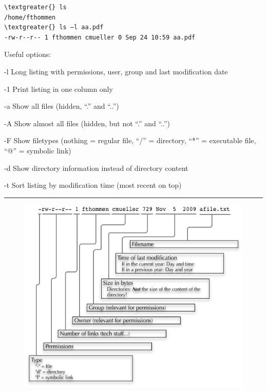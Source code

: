 \documentclass[letterpaper,10pt,english]{sphinxmanual}
\begin{document}
\begin{Verbatim}[commandchars=\\\{\}]
\textgreater{} ls
/home/fthommen
\textgreater{} ls –l aa.pdf
-rw-r--r-- 1 fthommen cmueller 0 Sep 24 10:59 aa.pdf
\end{Verbatim}

Useful options:
\begin{optionlist}{3cm}
\item [-l]  
Long listing with permissions, user, group and last modification date
\item [-1]  
Print listing in one column only
\item [-a]  
Show all files (hidden, “.” and “..”)
\item [-A]  
Show almost all files (hidden, but not “.” and “..”)
\item [-F]  
Show filetypes (nothing = regular file, “/” = directory, “*” = executable file, “@” = symbolic link)
\item [-d]  
Show directory information instead of  directory content
\item [-t]  
Sort listing by modification time (most recent on top)
\end{optionlist}


\bigskip\hrule{}\bigskip

\begin{figure}[htbp]
\centering

\includegraphics{_static/LongListingDeconstructed.png}
\end{figure}
\end{document}
